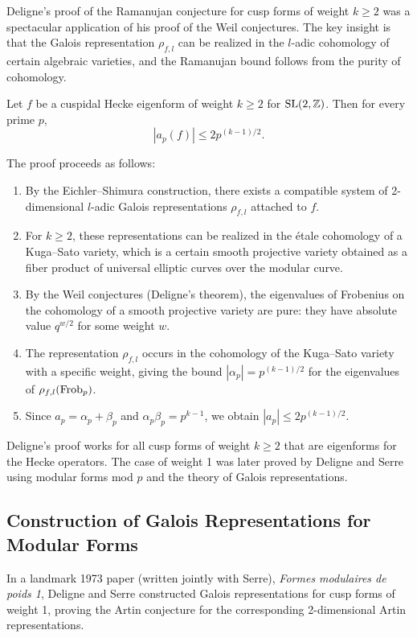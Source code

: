 Deligne's proof of the Ramanujan conjecture for cusp forms of weight \(k \geq 2\) was a spectacular application of his proof of the Weil conjectures. The key insight is that the Galois representation \(\rho_{f,l}\) can be realized in the \(l\)-adic cohomology of certain algebraic varieties, and the Ramanujan bound follows from the purity of cohomology.

\begin{theorem}[Deligne, 1974]
Let \(f\) be a cuspidal Hecke eigenform of weight \(k \geq 2\) for \(\operatorname{SL}(2,\mathbb{Z})\). Then for every prime \(p\),
\[
|a_p(f)| \leq 2 p^{(k-1)/2}.
\]
\end{theorem}

The proof proceeds as follows:
\begin{enumerate}
    \item By the Eichler--Shimura construction, there exists a compatible system of 2-dimensional \(l\)-adic Galois representations \(\rho_{f,l}\) attached to \(f\).
    \item For \(k \geq 2\), these representations can be realized in the \'etale cohomology of a Kuga--Sato variety, which is a certain smooth projective variety obtained as a fiber product of universal elliptic curves over the modular curve.
    \item By the Weil conjectures (Deligne's theorem), the eigenvalues of Frobenius on the cohomology of a smooth projective variety are pure: they have absolute value \(q^{w/2}\) for some weight \(w\).
    \item The representation \(\rho_{f,l}\) occurs in the cohomology of the Kuga--Sato variety with a specific weight, giving the bound \(|\alpha_p| = p^{(k-1)/2}\) for the eigenvalues of \(\rho_{f,l}(\operatorname{Frob}_p)\).
    \item Since \(a_p = \alpha_p + \beta_p\) and \(\alpha_p \beta_p = p^{k-1}\), we obtain \(|a_p| \leq 2 p^{(k-1)/2}\).
\end{enumerate}

Deligne's proof works for all cusp forms of weight \(k \geq 2\) that are eigenforms for the Hecke operators. The case of weight 1 was later proved by Deligne and Serre using modular forms mod \(p\) and the theory of Galois representations.

\subsection{Construction of Galois Representations for Modular Forms}

In a landmark 1973 paper (written jointly with Serre), \textit{Formes modulaires de poids 1}, Deligne and Serre constructed Galois representations for cusp forms of weight 1, proving the Artin conjecture for the corresponding 2-dimensional Artin representations.


